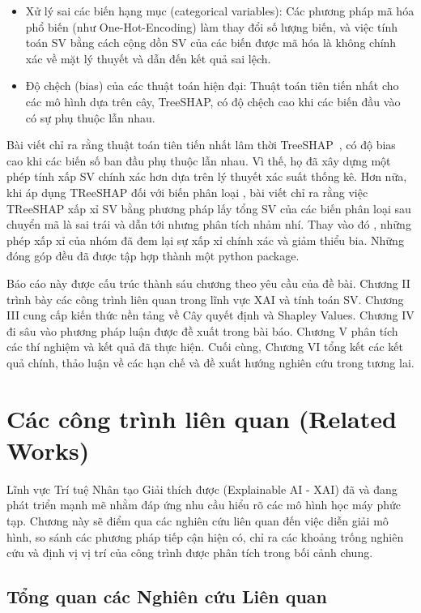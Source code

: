 \documentclass[12pt, a4paper]{article}
\begin{document}
\begin{itemize}
    \item{Xử lý sai các biến hạng mục (categorical variables): Các phương pháp mã hóa phổ biến (như One-Hot-Encoding) làm thay đổi số lượng biến, và việc tính toán SV bằng cách cộng dồn SV của các biến được mã hóa là không chính xác về mặt lý thuyết và dẫn đến kết quả sai lệch.}
    \item{Độ chệch (bias) của các thuật toán hiện đại: Thuật toán tiên tiến nhất cho các mô hình dựa trên cây, TreeSHAP, có độ chệch cao khi các biến đầu vào có sự phụ thuộc lẫn nhau.}
\end{itemize}

Bài viết chỉ ra rằng thuật toán tiên tiến nhất lâm thời TreeSHAP~\citep{Lundberg2020}, có độ bias cao khi các biến số ban đầu phụ thuộc lẫn nhau. Vì thế, họ đã xây dựng một phép tính xấp SV chính xác hơn dựa trên lý thuyết xác suất thống kê.
Hơn nữa, khi áp dụng TReeSHAP đối với biến phân loại , bài viết chỉ ra rằng việc TReeSHAP xấp xỉ SV bằng phương pháp lấy tổng SV của các biến phân loại sau chuyển mã là sai trái và dẫn tới nhưng phân tích nhảm nhí. Thay vào đó , những phép xấp xỉ của nhóm đã đem lại sự xấp xỉ chính xác và giảm thiểu bia. Những đóng góp đều đã được tập hợp thành một python package.

Báo cáo này được cấu trúc thành sáu chương theo yêu cầu của đề bài. Chương II trình bày các công trình liên quan trong lĩnh vực XAI và tính toán SV. Chương III cung cấp kiến thức nền tảng về Cây quyết định và Shapley Values. Chương IV đi sâu vào phương pháp luận được đề xuất trong bài báo. Chương V phân tích các thí nghiệm và kết quả đã thực hiện. Cuối cùng, Chương VI tổng kết các kết quả chính, thảo luận về các hạn chế và đề xuất hướng nghiên cứu trong tương lai.

\section{Các công trình liên quan (Related Works)}

Lĩnh vực Trí tuệ Nhân tạo Giải thích được (Explainable AI - XAI) đã và đang phát triển mạnh mẽ nhằm đáp ứng nhu cầu hiểu rõ các mô hình học máy phức tạp. Chương này sẽ điểm qua các nghiên cứu liên quan đến việc diễn giải mô hình, so sánh các phương pháp tiếp cận hiện có, chỉ ra các khoảng trống nghiên cứu và định vị vị trí của công trình được phân tích trong bối cảnh chung.

\subsection{Tổng quan các Nghiên cứu Liên quan}
\end{document}
